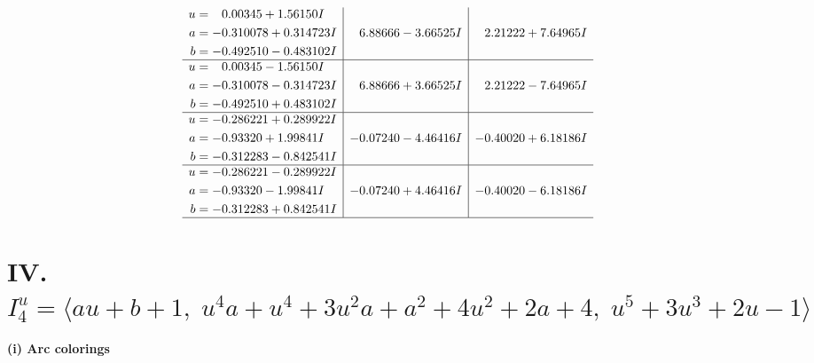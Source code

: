 \documentclass[1p]{elsarticle_modified}
\theoremstyle{definition}
\begin{document}
$$\begin{array}{c|c|c}
\begin{aligned}
u &= \phantom{-}0.00345 + 1.56150 I \\
a &= -0.310078 + 0.314723 I \\
b &= -0.492510 - 0.483102 I\end{aligned}
 & \phantom{-}6.88666 - 3.66525 I & \phantom{-}2.21222 + 7.64965 I \\ \hline\begin{aligned}
u &= \phantom{-}0.00345 - 1.56150 I \\
a &= -0.310078 - 0.314723 I \\
b &= -0.492510 + 0.483102 I\end{aligned}
 & \phantom{-}6.88666 + 3.66525 I & \phantom{-}2.21222 - 7.64965 I \\ \hline\begin{aligned}
u &= -0.286221 + 0.289922 I \\
a &= -0.93320 + 1.99841 I \\
b &= -0.312283 - 0.842541 I\end{aligned}
 & -0.07240 - 4.46416 I & -0.40020 + 6.18186 I \\ \hline\begin{aligned}
u &= -0.286221 - 0.289922 I \\
a &= -0.93320 - 1.99841 I \\
b &= -0.312283 + 0.842541 I\end{aligned}
 & -0.07240 + 4.46416 I & -0.40020 - 6.18186 I\\
 \hline 
 \end{array}$$\newpage\newpage\renewcommand{\arraystretch}{1}
\centering \section*{IV. $I^u_{4}= \langle a u+b+1,\;u^4 a+u^4+3 u^2 a+a^2+4 u^2+2 a+4,\;u^5+3 u^3+2 u-1 \rangle$}
\flushleft \textbf{(i) Arc colorings}\\
\end{document}
